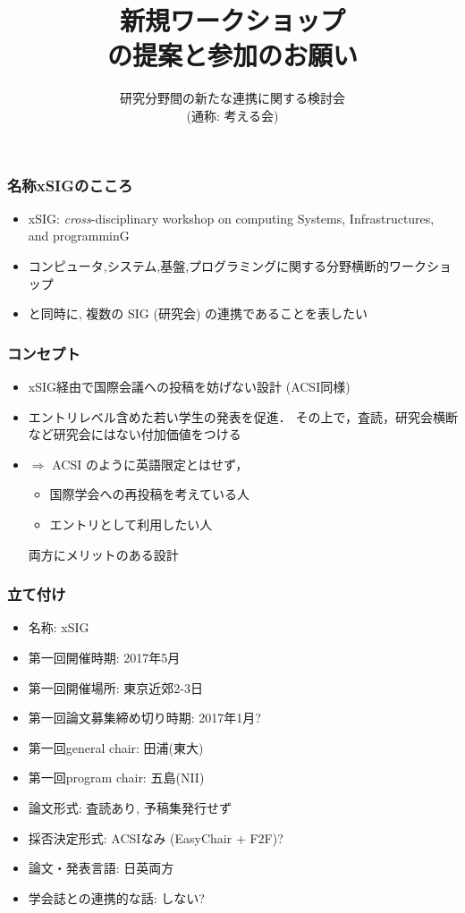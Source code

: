 \documentclass[12pt,dvipdfmx]{beamer}
\title{新規ワークショップ \\
\confname の提案と参加のお願い}
\institute{}
\author{研究分野間の新たな連携に関する検討会 \\
(通称: 考える会)}
\date{}
\newcommand{\confname}{{xSIG}}
\newcommand{\firstconfdate}{\ao{2017年5月}}
\newcommand{\firstconfplace}{\ao{東京近郊}}
\newcommand{\firstdeadline}{\ao{2017年1月}}
\newcommand{\firstgeneralchair}{\ao{田浦(東大)}}
\newcommand{\firstprogramchair}{\ao{五島(NII)}}
\newcommand{\ao}[1]{{\color{blue}#1}}
\begin{document}
\maketitle

\begin{frame}
\frametitle{名称\confname のこころ}
\begin{itemize}
\item xSIG: \emph{\ao{cross}}-disciplinary workshop on computing \ao{S}ystems, \ao{I}nfrastructures, and programmin\ao{G} 
\item コンピュータ,システム,基盤,プログラミングに関する分野横断的ワークショップ
\item と同時に, 複数の SIG (研究会) の連携であることを表したい
\end{itemize}
\end{frame}

\begin{frame}
\frametitle{コンセプト}
\begin{itemize}
\item \confname 経由で\ao{国際会議への投稿を妨げない}設計 (ACSI同様)
\item \ao{エントリレベル}含めた若い学生の発表を促進．
その上で，査読，研究会横断など研究会にはない付加価値をつける
\item $\Rightarrow$ ACSI のように英語限定とはせず，
  \begin{itemize}
  \item 国際学会への再投稿を考えている人
  \item エントリとして利用したい人
  \end{itemize}
\ao{両方にメリット}のある設計
\end{itemize}

\end{frame}


\begin{frame}
\frametitle{立て付け}
\begin{itemize}
\item 名称: \confname
\item 第一回開催時期: \firstconfdate 
\item 第一回開催場所: \firstconfplace 2-3日
\item 第一回論文募集締め切り時期: \firstdeadline ?
\item 第一回general chair: \firstgeneralchair
\item 第一回program chair: \firstprogramchair
\item 論文形式: \ao{査読あり, 予稿集発行せず}
\item 採否決定形式: \ao{ACSIなみ (EasyChair + F2F)?}
\item 論文・発表言語: \ao{日英両方}
\item 学会誌との連携的な話: \ao{しない?}
\end{itemize}
\end{frame}
\end{document}
